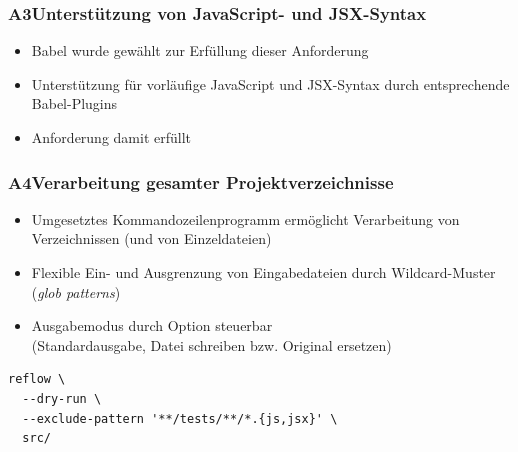       \begin{frame}
        \frametitle{A3\hspace{0.75em}Unterstützung von JavaScript- und JSX-Syntax}
        \begin{itemize}
          \item Babel wurde gewählt zur Erfüllung dieser Anforderung
          \item Unterstützung für vorläufige JavaScript und JSX-Syntax durch entsprechende Babel-Plugins
          \item Anforderung damit erfüllt
        \end{itemize}
      \end{frame}

      \begin{frame}[fragile]
        \frametitle{A4\hspace{0.75em}Verarbeitung gesamter Projektverzeichnisse}
        \begin{itemize}
          \item Umgesetztes Kommandozeilenprogramm ermöglicht Verarbeitung von Verzeichnissen (und von Einzeldateien)
          \item Flexible Ein- und Ausgrenzung von Eingabedateien durch Wildcard-Muster (\textit{glob patterns})
          \item Ausgabemodus durch Option steuerbar\\(Standardausgabe, Datei schreiben bzw. Original ersetzen)
        \end{itemize}

        \bigskip
        \begin{lstlisting}[numbers=none]
reflow \
  --dry-run \
  --exclude-pattern '**/tests/**/*.{js,jsx}' \
  src/
        \end{lstlisting}
      \end{frame}

